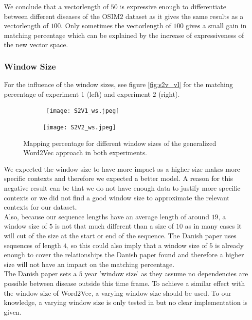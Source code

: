We conclude that a vectorlength of $50$ is expressive enough to differentiate between different diseases of the OSIM2 dataset as it gives the same results as a vectorlength of $100$. Only sometimes the vectorlength of $100$ gives a small gain in matching percentage which can be explained by the increase of expressiveness of the new vector space.

\subsubsection{Window Size}

For the influence of the window sizes, see figure \ref{fig:s2v_vl} for the matching percentage of experiment $1$ (left) and experiment $2$ (right). \\

\begin{figure}[!htb]
	\centering
	\begin{subfigure}[b]{.49\textwidth}\
		\texttt{[image: S2V1\_ws.jpeg]}
	\end{subfigure}
	\begin{subfigure}[b]{.49\textwidth}
		\texttt{[image: S2V2\_ws.jpeg]}
	\end{subfigure}
	\caption{Mapping percentage for different window sizes of the generalized Word2Vec 		approach in both experiments.}
	\label{fig:s2v_ws}
\end{figure}

We expected the window size to have more impact as a higher size makes more specific contexts and therefore we expected a better model. A reason for this negative result can be that we do not have enough data to justify more specific contexts or we did not find a good window size to approximate the relevant contexts for our dataset. \\
Also, because our sequence lengths have an average length of around $19$, a window size of $5$ is not that much different than a size of $10$ as in many cases it will cut of the size at the start or end of the sequence. The Danish paper uses sequences of length $4$, so this could also imply that a window size of $5$ is already enough to cover the relationships the Danish paper found and therefore a higher size will not have an impact on the matching percentage. \\
The Danish paper sets a $5$ year 'window size' as they assume no dependencies are possible between disease outside this time frame. To achieve a similar effect with the window size of Word2Vec, a varying window size should be used. To our knowledge, a varying window size is only tested in \cite{w2vTuning:article} but no clear implementation is given. 

